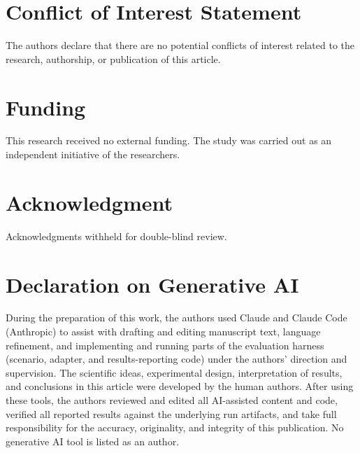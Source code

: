 \documentclass[conference,letterpaper]{IEEEtran}
\begin{document}
\section*{Conflict of Interest Statement}
The authors declare that there are no potential conflicts of interest related to the research,
authorship, or publication of this article.

\section*{Funding}
This research received no external funding. The study was carried out as an independent initiative
of the researchers.

\section*{Acknowledgment}
Acknowledgments withheld for double-blind review.

\section*{Declaration on Generative AI}
During the preparation of this work, the authors used Claude and Claude Code (Anthropic) to assist
with drafting and editing manuscript text, language refinement, and implementing and running parts of
the evaluation harness (scenario, adapter, and results-reporting code) under the authors' direction
and supervision. The scientific ideas, experimental design, interpretation of results, and conclusions
in this article were developed by the human authors. After using these tools, the authors reviewed and
edited all AI-assisted content and code, verified all reported results against the underlying run
artifacts, and take full responsibility for the accuracy, originality, and integrity of this
publication. No generative AI tool is listed as an author.

\balance


\end{document}
